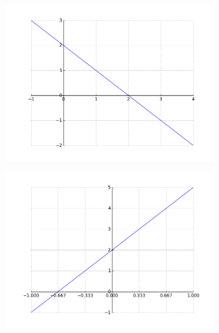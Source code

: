 \documentclass[12pt,twoside,onecolumn]{article}
\begin{document}
\begin{Exercise}
\begin{figure}[h!]
\begin{subfigure}{.5\textwidth}
    \end{subfigure}%
    \begin{subfigure}{.5\textwidth}
    \centering
    \includegraphics[scale = 0.5]{figures/mXp2.png}
    \end{subfigure}
    \begin{subfigure}{.5\textwidth}
    \centering
    \includegraphics[scale = 0.5]{figures/3Xp2.png}
    \end{subfigure}%
    \begin{subfigure}{.5\textwidth}
    \centering

\end{subfigure}
\end{figure}
\end{Exercise}
\end{document}
